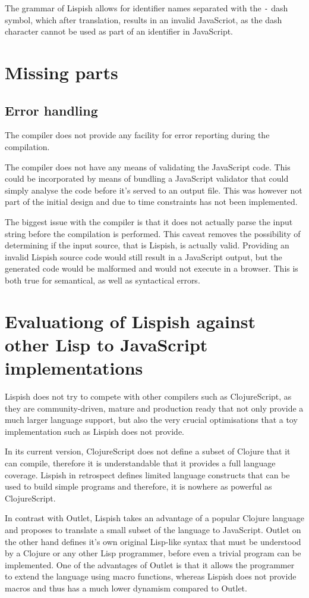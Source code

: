 The grammar of Lispish allows for identifier names separated with the \texttt{-} dash symbol, which after translation, results in an invalid JavaScriot, as the dash character cannot be used as part of an identifier in JavaScript.

\section{Missing parts}
\subsection{Error handling}
The compiler does not provide any facility for error reporting during the compilation.

The compiler does not have any means of validating the JavaScript code. This could be incorporated by means of bundling a JavaScript validator that could simply analyse the code before it's served to an output file. This was however not part of the initial design and due to time constraints has not been implemented.

The biggest issue with the compiler is that it does not actually parse the input string before the compilation is performed. This caveat removes the possibility of determining if the input source, that is Lispish, is actually valid. 
Providing an invalid Lispish source code would still result in a JavaScript output, but the generated code would be malformed and would not execute in a browser. This is both true for semantical, as well as syntactical errors.

\section{Evaluationg of Lispish against other Lisp to JavaScript implementations}\label{lispish-vs-rest}

Lispish does not try to compete with other compilers such as ClojureScript, as they are community-driven, mature and production ready that not only provide a much larger language support, but also the very crucial optimisations that a toy implementation such as Lispish does not provide. 

In its current version, ClojureScript does not define a subset of Clojure that it can compile, therefore it is understandable that it provides a full language coverage. Lispish in retrospect defines limited language constructs that can be used to build simple programs and therefore, it is nowhere as powerful as ClojureScript.

In contrast with Outlet, Lispish takes an advantage of a popular Clojure language and proposes to translate a small subset of the language to JavaScript. Outlet on the other hand defines it's own original Lisp-like syntax that must be understood by a Clojure or any other Lisp programmer, before even a trivial program can be implemented.
One of the advantages of Outlet is that it allows the programmer to extend the language using macro functions, whereas Lispish does not provide macros and thus has a much lower dynamism compared to Outlet. 






